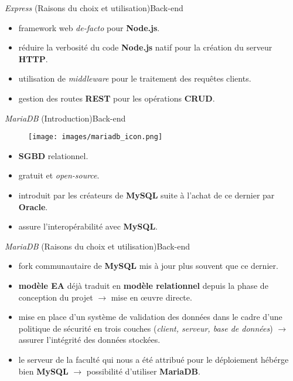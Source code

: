 \documentclass[usenames,dvipsnames]{beamer}
\begin{document}
\begin{frame}{\textit{Express} (Raisons du choix et utilisation)}{Back-end}
  \begin{itemize}
    \item framework web \textit{de-facto} pour \textbf{Node.js}.
    \item réduire la verbosité du code \textbf{Node.js} natif pour la création du serveur \textbf{HTTP}.
    \item utilisation de \textit{middleware} pour le traitement des requêtes clients.
    \item gestion des routes \textbf{REST} pour les opérations \textbf{CRUD}.
  \end{itemize}
\end{frame}
\begin{frame}{\textit{MariaDB} (Introduction)}{Back-end}
  \begin{figure}[!ht]
    \centering
    \texttt{[image: images/mariadb\_icon.png]}
  \end{figure}

  \begin{itemize}
    \item \textbf{SGBD} relationnel.
    \item gratuit et \textit{open-source}.
    \item introduit par les créateurs de \textbf{MySQL} suite à l'achat de ce dernier par \textbf{Oracle}.
    \item assure l'interopérabilité avec \textbf{MySQL}.
  \end{itemize}
\end{frame}

\begin{frame}{\textit{MariaDB} (Raisons du choix et utilisation)}{Back-end}
  \begin{itemize}
    \item fork communautaire de \textbf{MySQL} mis à jour plus souvent que ce dernier.
    \item \textbf{modèle EA} déjà traduit en \textbf{modèle relationnel} depuis la phase de conception du projet $\rightarrow$ mise en \oe{}uvre directe.
    \item mise en place d'un système de validation des données dans le cadre d'une politique de sécurité en trois couches (\textit{client, serveur, base de données}) $\rightarrow$ assurer l'intégrité des données stockées.
    \item le serveur de la faculté qui nous a été attribué pour le déploiement hébérge bien \textbf{MySQL} $\rightarrow$ possibilité d'utiliser \textbf{MariaDB}.
  \end{itemize}
\end{frame}
\end{document}
